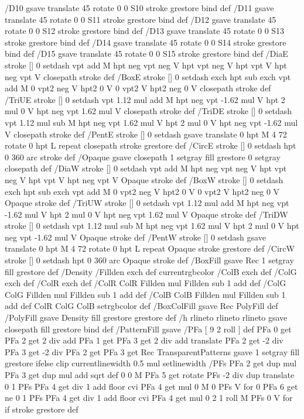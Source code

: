 /D10 {gsave translate 45 rotate 0 0 S10 stroke grestore} bind def
/D11 {gsave translate 45 rotate 0 0 S11 stroke grestore} bind def
/D12 {gsave translate 45 rotate 0 0 S12 stroke grestore} bind def
/D13 {gsave translate 45 rotate 0 0 S13 stroke grestore} bind def
/D14 {gsave translate 45 rotate 0 0 S14 stroke grestore} bind def
/D15 {gsave translate 45 rotate 0 0 S15 stroke grestore} bind def
/DiaE {stroke [] 0 setdash vpt add M
  hpt neg vpt neg V hpt vpt neg V
  hpt vpt V hpt neg vpt V closepath stroke} def
/BoxE {stroke [] 0 setdash exch hpt sub exch vpt add M
  0 vpt2 neg V hpt2 0 V 0 vpt2 V
  hpt2 neg 0 V closepath stroke} def
/TriUE {stroke [] 0 setdash vpt 1.12 mul add M
  hpt neg vpt -1.62 mul V
  hpt 2 mul 0 V
  hpt neg vpt 1.62 mul V closepath stroke} def
/TriDE {stroke [] 0 setdash vpt 1.12 mul sub M
  hpt neg vpt 1.62 mul V
  hpt 2 mul 0 V
  hpt neg vpt -1.62 mul V closepath stroke} def
/PentE {stroke [] 0 setdash gsave
  translate 0 hpt M 4 {72 rotate 0 hpt L} repeat
  closepath stroke grestore} def
/CircE {stroke [] 0 setdash 
  hpt 0 360 arc stroke} def
/Opaque {gsave closepath 1 setgray fill grestore 0 setgray closepath} def
/DiaW {stroke [] 0 setdash vpt add M
  hpt neg vpt neg V hpt vpt neg V
  hpt vpt V hpt neg vpt V Opaque stroke} def
/BoxW {stroke [] 0 setdash exch hpt sub exch vpt add M
  0 vpt2 neg V hpt2 0 V 0 vpt2 V
  hpt2 neg 0 V Opaque stroke} def
/TriUW {stroke [] 0 setdash vpt 1.12 mul add M
  hpt neg vpt -1.62 mul V
  hpt 2 mul 0 V
  hpt neg vpt 1.62 mul V Opaque stroke} def
/TriDW {stroke [] 0 setdash vpt 1.12 mul sub M
  hpt neg vpt 1.62 mul V
  hpt 2 mul 0 V
  hpt neg vpt -1.62 mul V Opaque stroke} def
/PentW {stroke [] 0 setdash gsave
  translate 0 hpt M 4 {72 rotate 0 hpt L} repeat
  Opaque stroke grestore} def
/CircW {stroke [] 0 setdash 
  hpt 0 360 arc Opaque stroke} def
/BoxFill {gsave Rec 1 setgray fill grestore} def
/Density {
  /Fillden exch def
  currentrgbcolor
  /ColB exch def /ColG exch def /ColR exch def
  /ColR ColR Fillden mul Fillden sub 1 add def
  /ColG ColG Fillden mul Fillden sub 1 add def
  /ColB ColB Fillden mul Fillden sub 1 add def
  ColR ColG ColB setrgbcolor} def
/BoxColFill {gsave Rec PolyFill} def
/PolyFill {gsave Density fill grestore grestore} def
/h {rlineto rlineto rlineto gsave closepath fill grestore} bind def
%
%
/PatternFill {gsave /PFa [ 9 2 roll ] def
  PFa 0 get PFa 2 get 2 div add PFa 1 get PFa 3 get 2 div add translate
  PFa 2 get -2 div PFa 3 get -2 div PFa 2 get PFa 3 get Rec
  TransparentPatterns {} {gsave 1 setgray fill grestore} ifelse
  clip
  currentlinewidth 0.5 mul setlinewidth
  /PFs PFa 2 get dup mul PFa 3 get dup mul add sqrt def
  0 0 M PFa 5 get rotate PFs -2 div dup translate
  0 1 PFs PFa 4 get div 1 add floor cvi
	{PFa 4 get mul 0 M 0 PFs V} for
  0 PFa 6 get ne {
	0 1 PFs PFa 4 get div 1 add floor cvi
	{PFa 4 get mul 0 2 1 roll M PFs 0 V} for
 } if
  stroke grestore} def
